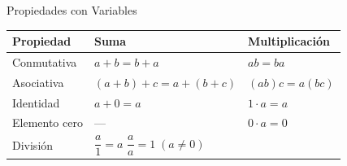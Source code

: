\documentclass[12pt, letterpaper]{article}
\begin{document}
\begin{concepto}{Propiedades con Variables}
	\vspace{0.2cm}
	\renewcommand{\arraystretch}{1.5}
	\begin{longtable}{|m{3.5cm}|m{5cm}|m{5cm}|}
		\hline
		\rowcolor{valblue!20}
		\textbf{Propiedad} & \textbf{Suma}                                                                    & \textbf{Multiplicación} \\
		\hline
		Conmutativa        & $a+b = b+a$                                                                      & $ab = ba$               \\
		\hline
		Asociativa         & $(a+b)+c = a+(b+c)$                                                              & $(ab)c = a(bc)$         \\
		\hline
		Identidad          & $a+0 = a$                                                                        & $1\cdot a = a$          \\
		\hline
		Elemento cero      & ---                                                                              & $0\cdot a = 0$          \\
		\hline
		División           & \multicolumn{2}{m{10.3cm}|}{$\dfrac{a}{1}=a$ \qquad $\dfrac{a}{a}=1\;(a\neq 0)$}                           \\
		\hline
	\end{longtable}
\end{concepto}
\end{document}
